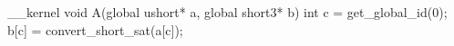 __kernel void A(global ushort* a, global short3* b) {
  int c = get_global_id(0);
  b[c] = convert_short_sat(a[c]);
}
